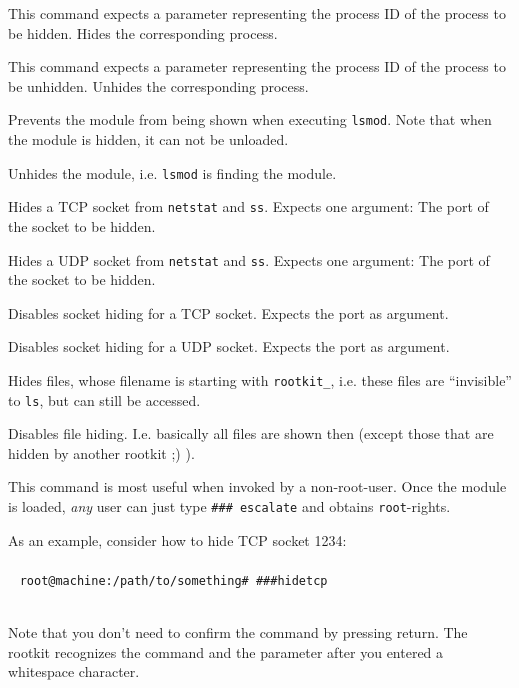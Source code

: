 \documentclass[10pt, letterpaper]{scrartcl}
\begin{document}
\begin{description}[font=\ttfamily]
\item[hideproc] This command expects a parameter representing the process ID of the process to be hidden. Hides the corresponding process. 
\item[unhideproc] This command expects a parameter representing the process ID of the process to be unhidden. Unhides the corresponding process. 
\item[hidemodule] Prevents the module from being shown when executing \texttt{lsmod}. Note that when the module is hidden, it can not be unloaded.
\item[unhidemodule] Unhides the module, i.e. \texttt{lsmod} is finding the module.
\item[hidetcp] Hides a TCP socket from \texttt{netstat} and \texttt{ss}. Expects one argument: The port of the socket to be hidden.
\item[hideudp] Hides a UDP socket from \texttt{netstat} and \texttt{ss}. Expects one argument: The port of the socket to be hidden. 
\item[unhidetcp] Disables socket hiding for a TCP socket. Expects the port as argument.
\item[unhideudp] Disables socket hiding for a UDP socket. Expects the port as argument. 
\item[hidefiles] Hides files, whose filename is starting with \texttt{rootkit\_}, i.e. these files are ``invisible'' to \texttt{ls}, but can still be accessed. 
\item[unhidefiles] Disables file hiding. I.e. basically all files are shown then (except those that are hidden by another rootkit ;) ).
\item[escalate] This command is most useful when invoked by a non-root-user. Once the module is loaded, \emph{any} user can just type \texttt{\#\#\# escalate} and obtains \texttt{root}-rights.
\end{description}

As an example, consider how to hide TCP socket 1234:
\\~
\\~
\texttt{root@machine:/path/to/something\# \#\#\#\textvisiblespace hidetcp\textvisiblespace}\\~

Note that you don't need to confirm the command by pressing return. The rootkit recognizes the command and the parameter after you entered a whitespace character.
\end{document}
